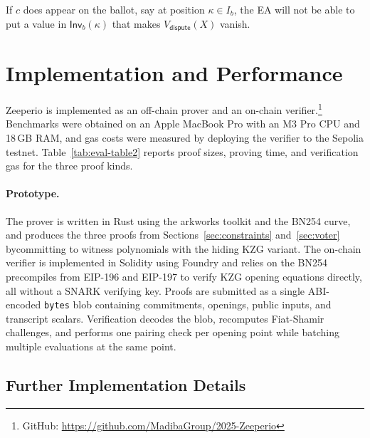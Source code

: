  If $c$ does appear on the ballot, say at position $\kappa\in I_b$, the EA will not be able to put a value in $\mathsf{Inv}_b(\kappa)$ that makes $V_{\mathsf{dispute}}(X)$ vanish. 






\section{Implementation and Performance}
Zeeperio is implemented as an off-chain prover and an on-chain verifier.\footnote{GitHub: \url{https://github.com/MadibaGroup/2025-Zeeperio}}
Benchmarks were obtained on an Apple MacBook Pro with an M3 Pro CPU and 18\,GB RAM, and gas costs were
measured by deploying the verifier to the Sepolia testnet.
Table~\ref{tab:eval-table2} reports proof sizes, proving time, and verification gas for the three proof kinds.\footnotemark
{}



\paragraph{Prototype.}
The prover is written in Rust using the arkworks toolkit and the BN254 curve, and produces the three proofs from Sections~\ref{sec:constraints} and~\ref{sec:voter} bycommitting to witness polynomials
with the hiding KZG variant.
The on-chain verifier is implemented in Solidity using Foundry and relies on the BN254 precompiles from
EIP-196 and EIP-197 to verify KZG opening equations directly, all without a SNARK verifying key.
Proofs are submitted as a single ABI-encoded \texttt{bytes} blob containing commitments, openings, public inputs,
and transcript scalars. Verification decodes the blob, recomputes Fiat-Shamir challenges, and performs one
pairing check per opening point while batching multiple evaluations at the same point.


\subsection{Further Implementation Details}
\label{app:implementation}

